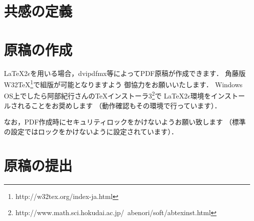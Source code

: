\documentclass[dvipdfmx]{issj}
\begin{document}
\section{共感の定義}  %












\section{原稿の作成}  %

\LaTeX 2$\epsilon$を用いる場合，dvipdfmx等によってPDF原稿が作成できます．
角藤版W32{\TeX}\footnote{http://w32tex.org/index-ja.html}で組版が可能となりますよう
御協力をお願いいたします．
Windows OS上でしたら阿部紀行さんのTeXインストーラ3\footnote{%
http://www.math.sci.hokudai.ac.jp/~abenori/soft/abtexinst.html}で
\LaTeX 2$\epsilon$環境をインストールされることをお奨めします
（動作確認もその環境で行っています）．

なお，PDF作成時にセキュリティロックをかけないようお願い致します
（標準の設定ではロックをかけないように設定されています）．

\section{原稿の提出}  %
\end{document}
